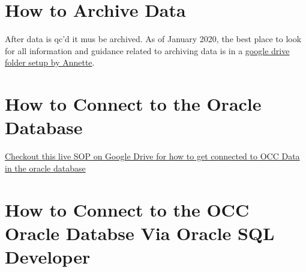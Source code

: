\documentclass[]{book}
\begin{document}
\hypertarget{how-to-archive-data}{%
\section{How to Archive Data}\label{how-to-archive-data}}

After data is qc'd it mus be archived. As of January 2020, the best place to look for all information and guidance related to archiving data is in a \href{https://drive.google.com/drive/folders/1Oq76hN6eOhhJOevwZiO0nX4Gtf0tiJrp}{google drive folder setup by Annette}.

\hypertarget{how-to-connect-to-the-oracle-database}{%
\section{How to Connect to the Oracle Database}\label{how-to-connect-to-the-oracle-database}}

\href{https://docs.google.com/document/d/19hVuyRj78kB3NHR4xF-mWZeOZCwYMDNSLSwQc08Af7s/edit\#}{Checkout this live SOP on Google Drive for how to get connected to OCC Data in the oracle database}

\hypertarget{how-to-connect-to-the-occ-oracle-databse-via-oracle-sql-developer}{%
\section{How to Connect to the OCC Oracle Databse Via Oracle SQL Developer}\label{how-to-connect-to-the-occ-oracle-databse-via-oracle-sql-developer}}
\end{document}
